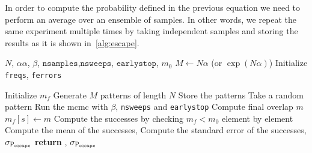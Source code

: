 \documentclass[\rootdir/main.tex]{subfiles}
\begin{document}
In order to compute the probability defined in the previous equation we need to perform an average over an ensemble of samples. In other words, we repeat the same experiment multiple times by taking independent samples and storing the results as it is shown in~\cref{alg:escape}.

\begin{algorithm}
    \caption{Computation of \pesc\ for a given range of $\alpha$.}
    \label{alg:escape}
    \begin{algorithmic}[1]
    \Require $N$, $\alpha \alpha$, $\beta$, $\mathtt{nsamples}$,$\mathtt{nsweeps}$, $\mathtt{earlystop}$, $m_0$
    \State $M \gets N\alpha$ (or $\exp(N\alpha)$)
    \State Initialize \texttt{freqs}, \texttt{ferrors} 

        \State Initialize $m_f$ 
            \State Generate $M$ patterns of length $N$
            \State Store the patterns 
            \State Take a random pattern \bxi
            \State Run the \acrshort{mcmc} with $\beta$, \texttt{nsweeps} and \texttt{earlystop}
            \State Compute final overlap $m$
            \State $m_f[s] \gets m$
        \EndFor
        \State Compute the successes by checking $m_f < m_0$ element by element 
        \State Compute the mean of the successes, \pesc
        \State Compute the standard error of the successes, $\sigma_{ \mathrm{P}_{\text{escape}} }$ 
    \EndFor
    \State \textbf{return} \pesc, $\sigma_{ \mathrm{P}_{\text{escape}} }$
    \end{algorithmic}
\end{algorithm}
\end{document}
